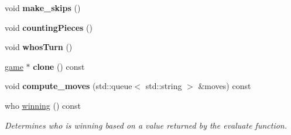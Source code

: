 \begin{DoxyCompactItemize}
\item 
void {\bfseries make\+\_\+skips} ()\hypertarget{classmain__savitch__14_1_1Othello_a3177234195a490eef52343d957e64b5d}{}\label{classmain__savitch__14_1_1Othello_a3177234195a490eef52343d957e64b5d}

\item 
void {\bfseries counting\+Pieces} ()\hypertarget{classmain__savitch__14_1_1Othello_a19f49edfbe82b84922877e00bc854ed8}{}\label{classmain__savitch__14_1_1Othello_a19f49edfbe82b84922877e00bc854ed8}

\item 
void {\bfseries whos\+Turn} ()\hypertarget{classmain__savitch__14_1_1Othello_a21440dbb4511812a76c578a5f546710b}{}\label{classmain__savitch__14_1_1Othello_a21440dbb4511812a76c578a5f546710b}

\item 
\hyperlink{classmain__savitch__14_1_1game}{game} $\ast$ {\bfseries clone} () const \hypertarget{classmain__savitch__14_1_1Othello_ab5a505f8a6ffd860376bf074c57e8a5f}{}\label{classmain__savitch__14_1_1Othello_ab5a505f8a6ffd860376bf074c57e8a5f}

\item 
void {\bfseries compute\+\_\+moves} (std\+::queue$<$ std\+::string $>$ \&moves) const \hypertarget{classmain__savitch__14_1_1Othello_aae15562565348c574b8e4c0b7782d19f}{}\label{classmain__savitch__14_1_1Othello_aae15562565348c574b8e4c0b7782d19f}

\item 
who \hyperlink{classmain__savitch__14_1_1Othello_a8934d1b63f73c03dae9629dbe03955d7}{winning} () const \hypertarget{classmain__savitch__14_1_1Othello_a8934d1b63f73c03dae9629dbe03955d7}{}\label{classmain__savitch__14_1_1Othello_a8934d1b63f73c03dae9629dbe03955d7}

\begin{DoxyCompactList}\small\item\em Determines who is winning based on a value returned by the evaluate function. \end{DoxyCompactList}\end{DoxyCompactItemize}
